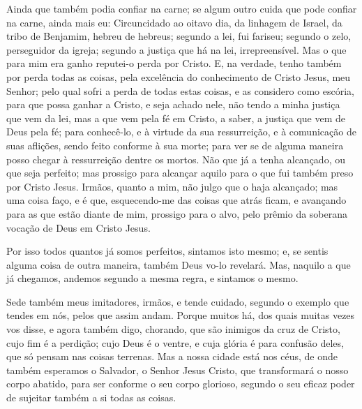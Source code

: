 Ainda que também podia confiar na carne; se algum outro cuida que
pode confiar na carne, ainda mais eu: Circuncidado ao oitavo
dia, da linhagem de Israel, da tribo de Benjamim, hebreu de hebreus;
segundo a lei, fui fariseu; segundo o zelo, perseguidor da
igreja; segundo a justiça que há na lei, irrepreensível. Mas o
que para mim era ganho reputei-o perda por Cristo. E, na
verdade, tenho também por perda todas as coisas, pela excelência do
conhecimento de Cristo Jesus, meu Senhor; pelo qual sofri a perda de
todas estas coisas, e as considero como escória, para que possa
ganhar a Cristo, e seja achado nele, não tendo a minha justiça
que vem da lei, mas a que vem pela fé em Cristo, a saber, a justiça
que vem de Deus pela fé; para conhecê-lo, e à virtude da sua
ressurreição, e à comunicação de suas aflições, sendo feito conforme
à sua morte; para ver se de alguma maneira posso chegar à
ressurreição dentre os mortos. Não que já a tenha alcançado,
ou que seja perfeito; mas prossigo para alcançar aquilo para o que
fui também preso por Cristo Jesus. Irmãos, quanto a mim, não
julgo que o haja alcançado; mas uma coisa faço, e é que,
esquecendo-me das coisas que atrás ficam, e avançando para as que
estão diante de mim, prossigo para o alvo, pelo prêmio da
soberana vocação de Deus em Cristo Jesus.

Por isso todos quantos já somos perfeitos, sintamos isto mesmo;
e, se sentis alguma coisa de outra maneira, também Deus vo-lo
revelará. Mas, naquilo a que já chegamos, andemos segundo a
mesma regra, e sintamos o mesmo.

Sede também meus imitadores, irmãos, e tende cuidado, segundo o
exemplo que tendes em nós, pelos que assim andam. Porque
muitos há, dos quais muitas vezes vos disse, e agora também digo,
chorando, que são inimigos da cruz de Cristo, cujo fim é a
perdição; cujo Deus é o ventre, e cuja glória é para confusão deles,
que só pensam nas coisas terrenas. Mas a nossa cidade está
nos céus, de onde também esperamos o Salvador, o Senhor Jesus
Cristo, que transformará o nosso corpo abatido, para ser
conforme o seu corpo glorioso, segundo o seu eficaz poder de
sujeitar também a si todas as coisas.

\medskip

